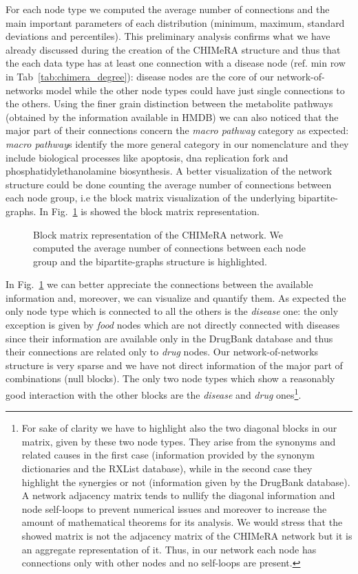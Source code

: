 \documentclass{standalone}
\begin{document}
For each node type we computed the average number of connections and the main important parameters of each distribution (minimum, maximum, standard deviations and percentiles).
This preliminary analysis confirms what we have already discussed during the creation of the CHIMeRA structure and thus that the each data type has at least one connection with a disease node (ref. min row in Tab~\ref{tab:chimera_degree}): disease nodes are the core of our network-of-networks model while the other node types could have just single connections to the others.
Using the finer grain distinction between the metabolite pathways (obtained by the information available in HMDB) we can also noticed that the major part of their connections concern the \emph{macro pathway} category as expected: \emph{macro pathway}s identify the more general category in our nomenclature and they include biological processes like \textsf{apoptosis}, \textsf{dna replication fork} and \textsf{phosphatidylethanolamine biosynthesis}.
A better visualization of the network structure could be done counting the average number of connections between each node group, i.e the block matrix visualization of the underlying bipartite-graphs.
In Fig.~\ref{fig:chimera_bipartite} is showed the block matrix representation.

\begin{figure}[htbp]
\centering
\def\svgwidth{\textwidth}

\caption{Block matrix representation of the \textsf{CHIMeRA} network.
We computed the average number of connections between each node group and the bipartite-graphs structure is highlighted.
}
\label{fig:chimera_bipartite}
\end{figure}

In Fig.~\ref{fig:chimera_bipartite} we can better appreciate the connections between the available information and, moreover, we can visualize and quantify them.
As expected the only node type which is connected to all the others is the \emph{disease} one: the only exception is given by \emph{food} nodes which are not directly connected with diseases since their information are available only in the DrugBank database and thus their connections are related only to \emph{drug} nodes.
Our network-of-networks structure is very sparse and we have not direct information of the major part of combinations (null blocks).
The only two node types which show a reasonably good interaction with the other blocks are the \emph{disease} and \emph{drug} ones\footnote{
  For sake of clarity we have to highlight also the two diagonal blocks in our matrix, given by these two node types.
  They arise from the synonyms and related causes in the first case (information provided by the synonym dictionaries and the RXList database), while in the second case they highlight the synergies or not (information given by the DrugBank database).
  A network adjacency matrix tends to nullify the diagonal information and node self-loops to prevent numerical issues and moreover to increase the amount of mathematical theorems for its analysis.
  We would stress that the showed matrix is not the adjacency matrix of the \textsf{CHIMeRA} network but it is an aggregate representation of it.
  Thus, in our network each node has connections only with other nodes and no self-loops are present.
}.
\end{document}
